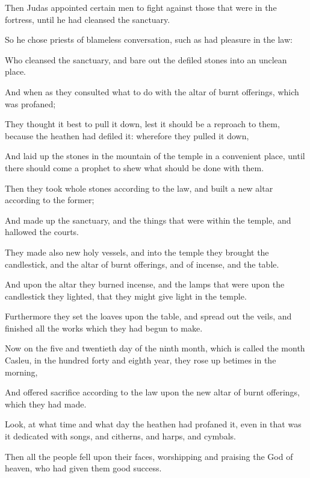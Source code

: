 {\par }{\PP {}Then Judas appointed certain men to fight against those that were in the fortress, until he had cleansed the sanctuary.
\par }{\PP {}So he chose priests of blameless conversation, such as had pleasure in the law:
\par }{\PP {}Who cleansed the sanctuary, and bare out the defiled stones into an unclean place.
\par }{\PP {}And when as they consulted what to do with the altar of burnt offerings, which was profaned;
\par }{\PP {}They thought it best to pull it down, lest it should be a reproach to them, because the heathen had defiled it: wherefore they pulled it down,
\par }{\PP {}And laid up the stones in the mountain of the temple in a convenient place, until there should come a prophet to shew what should be done with them.
\par }{\PP {}Then they took whole stones according to the law, and built a new altar according to the former;
\par }{\PP {}And made up the sanctuary, and the things that were within the temple, and hallowed the courts.
\par }{\PP {}They made also new holy vessels, and into the temple they brought the candlestick, and the altar of burnt offerings, and of incense, and the table.
\par }{\PP {}And upon the altar they burned incense, and the lamps that were upon the candlestick they lighted, that they might give light in the temple.
\par }{\PP {}Furthermore they set the loaves upon the table, and spread out the veils, and finished all the works which they had begun to make.
\par }{\PP {}Now on the five and twentieth day of the ninth month, which is called the month Casleu, in the hundred forty and eighth year, they rose up betimes in the morning,
\par }{\PP {}And offered sacrifice according to the law upon the new altar of burnt offerings, which they had made.
\par }{\PP {}Look, at what time and what day the heathen had profaned it, even in that was it dedicated with songs, and citherns, and harps, and cymbals.
\par }{\PP {}Then all the people fell upon their faces, worshipping and praising the God of heaven, who had given them good success.
}
